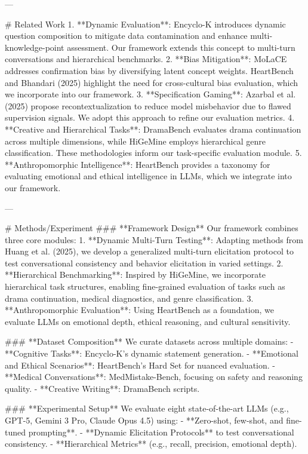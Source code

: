 ---

# Related Work  
1. **Dynamic Evaluation**: Encyclo-K introduces dynamic question composition to mitigate data contamination and enhance multi-knowledge-point assessment. Our framework extends this concept to multi-turn conversations and hierarchical benchmarks.  
2. **Bias Mitigation**: MoLaCE addresses confirmation bias by diversifying latent concept weights. HeartBench and Bhandari (2025) highlight the need for cross-cultural bias evaluation, which we incorporate into our framework.  
3. **Specification Gaming**: Azarbal et al. (2025) propose recontextualization to reduce model misbehavior due to flawed supervision signals. We adopt this approach to refine our evaluation metrics.  
4. **Creative and Hierarchical Tasks**: DramaBench evaluates drama continuation across multiple dimensions, while HiGeMine employs hierarchical genre classification. These methodologies inform our task-specific evaluation module.  
5. **Anthropomorphic Intelligence**: HeartBench provides a taxonomy for evaluating emotional and ethical intelligence in LLMs, which we integrate into our framework.

---

# Methods/Experiment  
### **Framework Design**
Our framework combines three core modules:
1. **Dynamic Multi-Turn Testing**: Adapting methods from Huang et al. (2025), we develop a generalized multi-turn elicitation protocol to test conversational consistency and behavior elicitation in varied settings.  
2. **Hierarchical Benchmarking**: Inspired by HiGeMine, we incorporate hierarchical task structures, enabling fine-grained evaluation of tasks such as drama continuation, medical diagnostics, and genre classification.  
3. **Anthropomorphic Evaluation**: Using HeartBench as a foundation, we evaluate LLMs on emotional depth, ethical reasoning, and cultural sensitivity.

### **Dataset Composition**
We curate datasets across multiple domains:
- **Cognitive Tasks**: Encyclo-K's dynamic statement generation.
- **Emotional and Ethical Scenarios**: HeartBench's Hard Set for nuanced evaluation.
- **Medical Conversations**: MedMistake-Bench, focusing on safety and reasoning quality.
- **Creative Writing**: DramaBench scripts.

### **Experimental Setup**
We evaluate eight state-of-the-art LLMs (e.g., GPT-5, Gemini 3 Pro, Claude Opus 4.5) using:
- **Zero-shot, few-shot, and fine-tuned prompting**.
- **Dynamic Elicitation Protocols** to test conversational consistency.
- **Hierarchical Metrics** (e.g., recall, precision, emotional depth).

